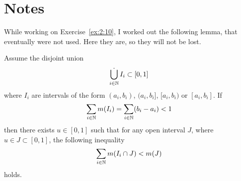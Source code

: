 

\section{Notes}

While working on Exercise~\ref{ex:2:10}, I worked out the following
lemma, that eventually were not used. Here they are, so they
will not be lost.

\begin{llem} \label{llem:interval:subsum}
Assume the disjoint union
\begin{equation*}
 \Disjunion_{i\in\N} I_i \subset [0,1]
\end{equation*}
where \(I_i\) are intervals of the form
\((a_i,b_i)\),
\((a_i,b_i]\),
\([a_i,b_i)\) or
\([a_i,b_i]\). If
\begin{equation*}
 \sum_{i\in\mathbb{N}} m(I_i) =  \sum_{i\in\mathbb{N}} (b_i - a_i) < 1
\end{equation*}
then there exists \(u\in[0,1]\) such that for any open interval $J$,
where \(u\in J\subset [0,1]\), the following inequality
\begin{equation*}
 \sum_{i\in\mathbb{N}} m(I_i \cap J) < m(J)
\end{equation*}
holds.
\end{llem}

